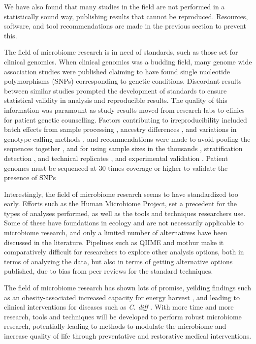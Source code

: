 We have also found that many studies in the field are not performed in a statistically sound way, publishing results that cannot be reproduced. Resources, software, and tool recommendations are made in the previous section to prevent this.

The field of microbiome research is in need of standards, such as those set for clinical genomics. When clinical genomics was a budding field, many genome wide association studies were published claiming to have found single nucleotide polymorphisms (SNPs) corresponding to genetic conditions. Discordant results between similar studies prompted the development of standards to ensure statistical validity in analysis and reproducible results. The quality of this information was paramount as study results moved from research labs to clinics for patient genetic counselling. Factors contributing to irreproducibility included batch effects from sample processing \cite{leek2010tackling}, ancestry differences \cite{price2006principal}, and variations in genotype calling methods \cite{miclaus2010variability}, and recommendations were made to avoid pooling the sequences together \cite{mccarthy2008genome}, and for using sample sizes in the thousands \cite{burton2007genome}, stratification detection \cite{price2006principal}, and technical replicates \cite{hong2012technical}, and experimental validation \cite{mccarthy2008genome}. Patient genomes must be sequenced at 30 times coverage or higher to validate the presence of SNPs \cite{rehm2013acmg}

Interestingly, the field of microbiome research seems to have standardized too early. Efforts such as the Human Microbiome Project, set a precedent for the types of analyses performed, as well as the tools and techniques researchers use. Some of these have foundations in ecology and are not necessarily applicable to microbiome research, and only a limited number of alternatives have been discussed in the literature. Pipelines such as QIIME \cite{caporaso2010qiime} and mothur \cite{schloss2009introducing} make it comparatively difficult for researchers to explore other analysis options, both in terms of analyzing the data, but also in terms of getting alternative options published, due to bias from peer reviews for the standard techniques.

The field of microbiome research has shown lots of promise, yeilding findings such as an obesity-associated increased capacity for energy harvest \cite{turnbaugh2006obesity}, and leading to clinical interventions for diseases such as \textit{C. diff} \cite{petrof2013stool}. With more time and more research, tools and techniques will be developed to perform robust microbiome research, potentially leading to methods to modulate the microbiome and increase quality of life through preventative and restorative medical interventions.
